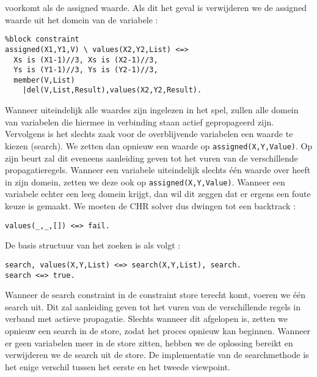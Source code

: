 voorkomt als de assigned waarde. Als dit het geval is verwijderen we de assigned waarde uit
het domein van de variabele :
\begin{verbatim}
%block constraint
assigned(X1,Y1,V) \ values(X2,Y2,List) <=> 
  Xs is (X1-1)//3, Xs is (X2-1)//3,
  Ys is (Y1-1)//3, Ys is (Y2-1)//3,
  member(V,List)
    |del(V,List,Result),values(X2,Y2,Result).
\end{verbatim}
Wanneer uiteindelijk alle waardes zijn ingelezen in het spel, zullen alle domein van variabelen
die hiermee in verbinding staan actief gepropageerd zijn. Vervolgens is het slechts zaak 
voor de overblijvende variabelen een waarde te kiezen (search). We zetten dan opnieuw
een waarde op \verb|assigned(X,Y,Value)|. Op zijn beurt zal dit eveneens aanleiding geven
tot het vuren van de verschillende propagatieregels. Wanneer een variabele uiteindelijk
slechts \'e\'en waarde over heeft in zijn domein, zetten we deze ook op \verb|assigned(X,Y,Value)|.
Wanneer een variabele echter een leeg domein krijgt, dan wil dit zeggen dat er ergens
een foute keuze is gemaakt. We moeten de CHR solver dus dwingen tot een backtrack :
\begin{verbatim}
values(_,_,[]) <=> fail.
\end{verbatim}
De basis structuur van het zoeken is als volgt :
\begin{verbatim}
search, values(X,Y,List) <=> search(X,Y,List), search.
search <=> true.
\end{verbatim}
Wanneer de search constraint in de constraint store terecht komt, voeren we \'e\'en search uit.
Dit zal aanleiding geven tot het vuren van de verschillende regels in verband met actieve
propagatie. Slechts wanneer dit afgelopen is, zetten we opnieuw een search in de store, zodat
het proces opnieuw kan beginnen. Wanneer er geen variabelen meer in de store zitten, 
hebben we de oplossing bereikt en verwijderen we de search uit de store.
De implementatie van de searchmethode is het enige verschil tussen het eerste en het tweede
viewpoint.
